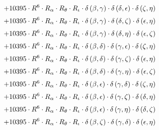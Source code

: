 \begin{subequations}
\begin{gather}
 \\[0.2em] \notag 		 + 10395 \cdot R^{6} \cdot R_{\alpha{}} \cdot R_{\theta{}} \cdot R_{\iota{}} \cdot \delta{}\left(\beta{}, \gamma{}\right) \cdot \delta{}\left(\delta{}, \epsilon{}\right) \cdot \delta{}\left(\zeta{}, \eta{}\right) 
 \\[0.2em] \notag 		 + 10395 \cdot R^{6} \cdot R_{\alpha{}} \cdot R_{\theta{}} \cdot R_{\iota{}} \cdot \delta{}\left(\beta{}, \gamma{}\right) \cdot \delta{}\left(\delta{}, \zeta{}\right) \cdot \delta{}\left(\epsilon{}, \eta{}\right) 
 \\[0.2em] \notag 		 + 10395 \cdot R^{6} \cdot R_{\alpha{}} \cdot R_{\theta{}} \cdot R_{\iota{}} \cdot \delta{}\left(\beta{}, \gamma{}\right) \cdot \delta{}\left(\delta{}, \eta{}\right) \cdot \delta{}\left(\epsilon{}, \zeta{}\right) 
 \\[0.2em] \notag 		 + 10395 \cdot R^{6} \cdot R_{\alpha{}} \cdot R_{\theta{}} \cdot R_{\iota{}} \cdot \delta{}\left(\beta{}, \delta{}\right) \cdot \delta{}\left(\gamma{}, \epsilon{}\right) \cdot \delta{}\left(\zeta{}, \eta{}\right) 
 \\[0.2em] \notag 		 + 10395 \cdot R^{6} \cdot R_{\alpha{}} \cdot R_{\theta{}} \cdot R_{\iota{}} \cdot \delta{}\left(\beta{}, \delta{}\right) \cdot \delta{}\left(\gamma{}, \zeta{}\right) \cdot \delta{}\left(\epsilon{}, \eta{}\right) 
 \\[0.2em] \notag 		 + 10395 \cdot R^{6} \cdot R_{\alpha{}} \cdot R_{\theta{}} \cdot R_{\iota{}} \cdot \delta{}\left(\beta{}, \delta{}\right) \cdot \delta{}\left(\gamma{}, \eta{}\right) \cdot \delta{}\left(\epsilon{}, \zeta{}\right) 
 \\[0.2em] \notag 		 + 10395 \cdot R^{6} \cdot R_{\alpha{}} \cdot R_{\theta{}} \cdot R_{\iota{}} \cdot \delta{}\left(\beta{}, \epsilon{}\right) \cdot \delta{}\left(\gamma{}, \delta{}\right) \cdot \delta{}\left(\zeta{}, \eta{}\right) 
 \\[0.2em] \notag 		 + 10395 \cdot R^{6} \cdot R_{\alpha{}} \cdot R_{\theta{}} \cdot R_{\iota{}} \cdot \delta{}\left(\beta{}, \epsilon{}\right) \cdot \delta{}\left(\gamma{}, \zeta{}\right) \cdot \delta{}\left(\delta{}, \eta{}\right) 
 \\[0.2em] \notag 		 + 10395 \cdot R^{6} \cdot R_{\alpha{}} \cdot R_{\theta{}} \cdot R_{\iota{}} \cdot \delta{}\left(\beta{}, \epsilon{}\right) \cdot \delta{}\left(\gamma{}, \eta{}\right) \cdot \delta{}\left(\delta{}, \zeta{}\right) 
 \\[0.2em] \notag 		 + 10395 \cdot R^{6} \cdot R_{\alpha{}} \cdot R_{\theta{}} \cdot R_{\iota{}} \cdot \delta{}\left(\beta{}, \zeta{}\right) \cdot \delta{}\left(\gamma{}, \delta{}\right) \cdot \delta{}\left(\epsilon{}, \eta{}\right) 

\end{gather}
\end{subequations}
